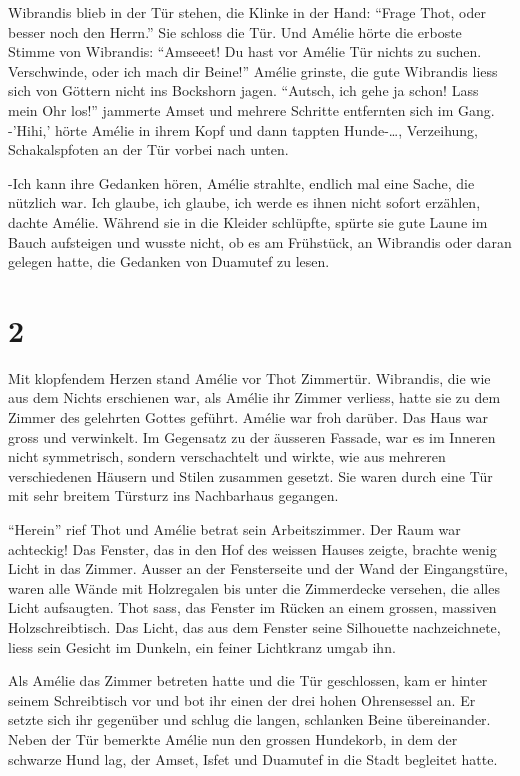 \documentclass[11pt,titlepage,a5paper]{book}
\begin{document}
 Wibrandis blieb in der Tür stehen, die Klinke in der Hand: "`Frage Thot, oder besser noch den Herrn."' Sie schloss die Tür. Und Amélie hörte die erboste Stimme von Wibrandis: "`Amseeet! Du hast vor Amélie Tür nichts zu suchen. Verschwinde, oder ich mach dir Beine!"' Amélie grinste, die gute Wibrandis liess sich von Göttern nicht ins Bockshorn jagen.  "`Autsch, ich gehe ja schon! Lass mein Ohr los!"' jammerte Amset und mehrere Schritte entfernten sich im Gang. -'Hihi,' hörte Amélie in ihrem Kopf und dann tappten Hunde-\dots, Verzeihung, Schakalspfoten an der Tür vorbei nach unten. 
 
 -Ich kann ihre Gedanken hören, Amélie strahlte, endlich mal eine Sache, die nützlich war. Ich glaube, ich glaube, ich werde es ihnen nicht sofort erzählen, dachte Amélie. Während sie in die Kleider schlüpfte, spürte sie gute Laune im Bauch aufsteigen und wusste nicht, ob es am Frühstück, an Wibrandis oder daran gelegen hatte, die Gedanken von Duamutef zu lesen.
 
\section*{2}
 
 Mit klopfendem Herzen stand Amélie vor Thot Zimmertür. Wibrandis, die wie aus dem Nichts erschienen war, als Amélie ihr Zimmer verliess, hatte sie zu dem Zimmer des gelehrten Gottes geführt. Amélie war froh darüber. Das Haus war gross und verwinkelt. Im Gegensatz zu der äusseren Fassade, war es im Inneren nicht symmetrisch, sondern verschachtelt und wirkte, wie aus mehreren verschiedenen Häusern und Stilen zusammen gesetzt. Sie waren durch eine Tür mit sehr breitem Türsturz ins Nachbarhaus gegangen.
 
 "`Herein"' rief Thot und Amélie betrat sein Arbeitszimmer. Der Raum war achteckig! Das Fenster, das in den Hof des weissen Hauses zeigte, brachte wenig Licht in das Zimmer. Ausser an der Fensterseite und der Wand der Eingangstüre, waren alle Wände mit Holzregalen bis unter die Zimmerdecke versehen, die alles Licht aufsaugten. Thot sass, das Fenster im Rücken an einem grossen, massiven Holzschreibtisch. Das Licht, das aus dem Fenster seine Silhouette nachzeichnete, liess sein Gesicht im Dunkeln, ein feiner Lichtkranz umgab ihn.
 
 Als Amélie das Zimmer betreten hatte und die Tür geschlossen, kam er hinter seinem Schreibtisch vor und bot ihr einen der drei hohen Ohrensessel an. Er setzte sich ihr gegenüber und schlug die langen, schlanken Beine übereinander. Neben der Tür bemerkte Amélie nun den grossen Hundekorb, in dem der schwarze Hund lag, der Amset, Isfet und Duamutef in die Stadt begleitet hatte.
 
\end{document}
